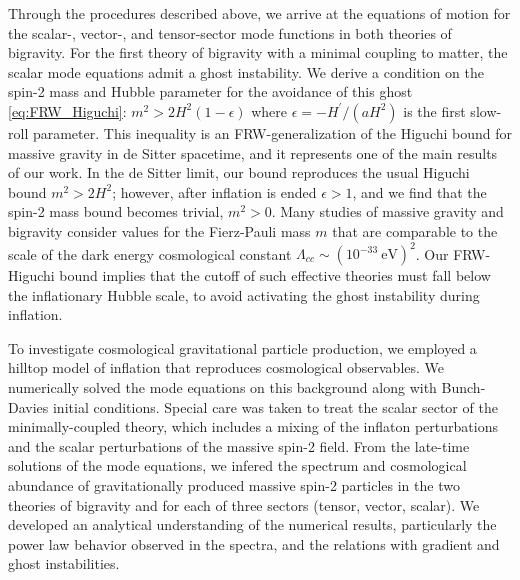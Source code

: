 \documentclass[11pt,a4paper]{article}
\begin{document}
Through the procedures described above, we arrive at the equations of motion for the scalar-, vector-, and tensor-sector mode functions in both theories of bigravity.  For the first theory of bigravity with a minimal coupling to matter, the scalar mode equations admit a ghost instability.  We derive a condition on the spin-2 mass and Hubble parameter for the avoidance of this ghost \eqref{eq:FRW_Higuchi}: $m^2 > 2 H^2 ( 1 - \epsilon )$ where $\epsilon = - H^\prime / (a H^2)$ is the first slow-roll parameter.  This inequality is an FRW-generalization of the Higuchi bound for massive gravity in de Sitter spacetime, and it represents one of the main results of our work.  In the de Sitter limit, our bound reproduces the usual Higuchi bound $m^2 > 2 H^2$; however, after inflation is ended $\epsilon > 1$, and we find that the spin-2 mass bound becomes trivial, $m^2 > 0$.  Many studies of massive gravity and bigravity consider values for the Fierz-Pauli mass $m$ that are comparable to the scale of the dark energy cosmological constant $\Lambda_{cc} \sim (10^{-33} \ \mathrm{eV})^2$.  Our FRW-Higuchi bound implies that the cutoff of such effective theories must fall below the inflationary Hubble scale, to avoid activating the ghost instability during inflation. 

To investigate cosmological gravitational particle production, we employed a hilltop model of inflation that reproduces cosmological observables.  We numerically solved the mode equations on this background along with Bunch-Davies initial conditions.  Special care was taken to treat the scalar sector of the minimally-coupled theory, which includes a mixing of the inflaton perturbations and the scalar perturbations of the massive spin-2 field.  From the late-time solutions of the mode equations, we infered the spectrum and cosmological abundance of gravitationally produced massive spin-2 particles in the two theories of bigravity and for each of three sectors (tensor, vector, scalar).  We developed an analytical understanding of the numerical results, particularly the power law behavior observed in the spectra, and the relations with gradient and ghost instabilities.  
\end{document}
